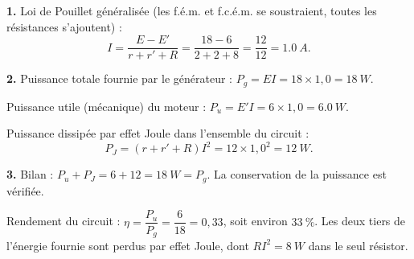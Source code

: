 \documentclass[11pt]{article}
\begin{document}
\begin{corrige}
\textbf{1.} Loi de Pouillet généralisée (les f.é.m. et f.c.é.m. se soustraient, toutes les résistances s'ajoutent) :
\[ I = \frac{E - E'}{r + r' + R} = \frac{18 - 6}{2 + 2 + 8} = \frac{12}{12} = \SI{1,0}{A}. \]

\textbf{2.} Puissance totale fournie par le générateur : $P_g = E I = 18 \times 1,0 = \SI{18}{W}$.

Puissance utile (mécanique) du moteur : $P_u = E' I = 6 \times 1,0 = \SI{6,0}{W}$.

Puissance dissipée par effet Joule dans l'ensemble du circuit :
\[ P_J = (r + r' + R) I^2 = 12 \times 1,0^2 = \SI{12}{W}. \]

\textbf{3.} Bilan : $P_u + P_J = 6 + 12 = \SI{18}{W} = P_g$. La conservation de la puissance est vérifiée.

Rendement du circuit : $\eta = \dfrac{P_u}{P_g} = \dfrac{6}{18} = 0,33$, soit environ $33~\%$. Les deux tiers de l'énergie fournie sont perdus par effet Joule, dont $R I^2 = \SI{8}{W}$ dans le seul résistor.
\end{corrige}
\end{document}
